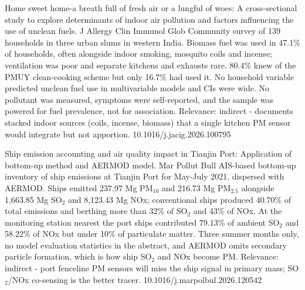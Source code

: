 \documentclass[10pt]{article}
\begin{document}
{Home sweet home-a breath full of fresh air or a lungful of woes: A cross-sectional study to explore determinants of indoor air pollution and factors influencing the use of unclean fuels.}
{J Allergy Clin Immunol Glob}
{Community survey of 139 households in three urban slums in western India. Biomass fuel was used in 47.1\% of households, often alongside indoor smoking, mosquito coils and incense; ventilation was poor and separate kitchens and exhausts rare. 80.4\% knew of the PMUY clean-cooking scheme but only 16.7\% had used it. No household variable predicted unclean fuel use in multivariable models and CIs were wide. No pollutant was measured, symptoms were self-reported, and the sample was powered for fuel prevalence, not for association. Relevance: indirect - documents stacked indoor sources (coils, incense, biomass) that a single kitchen PM sensor would integrate but not apportion.}
{10.1016/j.jacig.2026.100795}

\par{}\baselineskip{}\baselineskip
{}

{Ship emission accounting and air quality impact in Tianjin Port: Application of bottom-up method and AERMOD model.}
{Mar Pollut Bull}
{AIS-based bottom-up inventory of ship emissions at Tianjin Port for May-July 2021, dispersed with AERMOD. Ships emitted 237.97 Mg PM$_{10}$ and 216.73 Mg PM$_{2.5}$ alongside 1,663.85 Mg SO$_2$ and 8,123.43 Mg NOx; conventional ships produced 40.70\% of total emissions and berthing more than 32\% of SO$_2$ and 43\% of NOx. At the monitoring station nearest the port ships contributed 79.13\% of ambient SO$_2$ and 58.22\% of NOx but under 10\% of particulate matter. Three summer months only, no model evaluation statistics in the abstract, and AERMOD omits secondary particle formation, which is how ship SO$_2$ and NOx become PM. Relevance: indirect - port fenceline PM sensors will miss the ship signal in primary mass; SO$_2$/NOx co-sensing is the better tracer.}
{10.1016/j.marpolbul.2026.120542}
\end{document}
